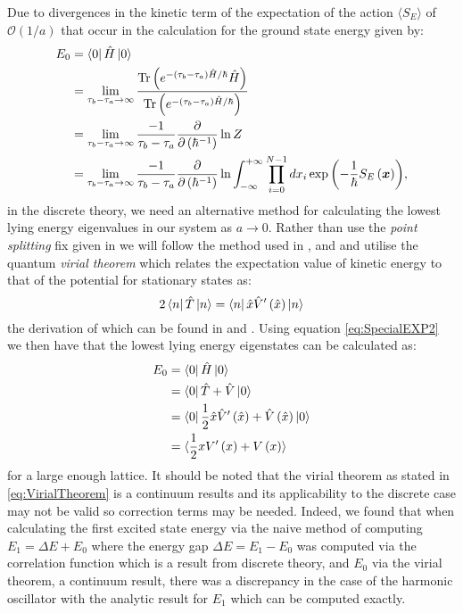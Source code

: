 \documentclass[12pt]{article}
\begin{document}
        Due to divergences in the kinetic term of the expectation of the action $\langle S_{E} \rangle$ of $\mathcal{O}\left(1/a\right) $\cite{creutz_freedman_1981} that occur in the calculation for the ground state energy given by:
        \begin{align}
            E_{0} & = \bra{0}\hat{H}\ket{0} \\
                  & = \lim_{\tau_b-\tau_a \rightarrow \infty} \frac{\text{Tr}\left(e^{-\left(\tau_b-\tau_a\right)\hat{H}/\hbar}\hat{H}\right)}{\text{Tr}\left(e^{-\left(\tau_b-\tau_a\right)\hat{H}/\hbar}\right)} \\
                  & = \lim_{\tau_b-\tau_a \rightarrow \infty} \frac{-1}{\tau_b-\tau_a} \frac{\partial}{\partial\left(\hbar^{-1}\right)}\ln{Z} \\
                  & = \lim_{\tau_b-\tau_a \rightarrow \infty} \frac{-1}{\tau_b-\tau_a} \frac{\partial}{\partial\left(\hbar^{-1}\right)}\ln \int^{+\infty}_{-\infty}\prod_{i=0}^{N-1}dx_i \exp{\left(-\frac{1}{\hbar}S_{E}\left(\bm{x}\right)\right)},
        \end{align}
        in the discrete theory, we need an alternative method for calculating the lowest lying energy eigenvalues in our system as $a\rightarrow 0$. Rather than use the \textit{point splitting} fix given in \cite{feynman_hibbs_1965} we will follow the method used in \cite{creutz_freedman_1981}, \cite{rodgers_raes} and \cite{slapik_serenone} and utilise the quantum \textit{virial theorem} which relates the expectation value of kinetic energy to that of the potential for stationary states as:
        \begin{equation}
            \label{eq:VirialTheorem}
            2\bra{n} \hat{T} \ket{n} = \bra{n} \hat{x} \hat{V}'\left(\hat{x}\right) \ket{n}
        \end{equation}
         the derivation of which can be found in \cite{binney_skinner_2015} and \cite{fock_1930}. Using equation \ref{eq:SpecialEXP2} we then have that the lowest lying energy eigenstates can be calculated as:
         \begin{align}
            E_0  & = \bra{0}\hat{H}\ket{0} \\
                 & = \bra{0}\hat{T}+\hat{V}\ket{0}\\
                 & = \bra{0}\frac{1}{2}\hat{x}\hat{V}'\left(\hat{x}\right)+\hat{V}\left(\hat{x}\right)\ket{0}\\
                 & = \langle \frac{1}{2}xV'\left(x\right) +  V\left(x\right) \rangle
         \end{align}
         for a large enough lattice. It should be noted that the virial theorem as stated in \ref{eq:VirialTheorem} is a continuum results and its applicability to the discrete case may not be valid so correction terms may be needed. Indeed, we found that when calculating the first excited state energy via the naive method of computing $E_1 = \Delta E + E_0$ where the energy gap $\Delta E = E_1 - E_0$ was computed via the correlation function which is a result from discrete theory, and $E_0$ via the virial theorem, a continuum result, there was a discrepancy in the case of the harmonic oscillator with the analytic result for $E_1$ which can be computed exactly.
        
\end{document}
